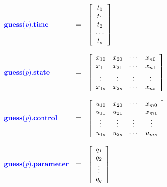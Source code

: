 \documentclass[10pt]{article}
\newcommand{\bfblue}[1]{\textcolor{blue}{\bf #1}}
\begin{document}
\begin{displaymath}
  \begin{array}{lcl}
    \bfblue{guess(\textit{p}).time} & = &
    \left[\begin{array}{c} t_0 \\ t_1 \\ t_2 \\ \cdots \\
        t_{s} \end{array} \right] \\ \\
    \bfblue{guess(\textit{p}).state} & = &
    \left[\begin{array}{cccc} x_{10} & x_{20} & \cdots & x_{n0} \\
        x_{11} & x_{21} & \cdots & x_{n1} \\
        \vdots & \vdots & \vdots & \vdots \\
        x_{1s} & x_{2s} & \cdots & x_{ns}
        \end{array} \right] \\ \\
    \bfblue{guess(\textit{p}).control} & = &
    \left[\begin{array}{cccc} u_{10} & x_{20} & \cdots & x_{m0} \\
        u_{11} & u_{21} & \cdots & x_{m1} \\
        \vdots & \vdots & \vdots & \vdots \\
        u_{1s} & u_{2s} & \cdots & u_{ms}
        \end{array}
      \right] \\ \\
    \bfblue{guess(\textit{p}).parameter} & = &
    \left[\begin{array}{c} q_1 \\ q_2 \\ \vdots \\ q_q \end{array} \right]
  \end{array}
\end{displaymath}
\end{document}
